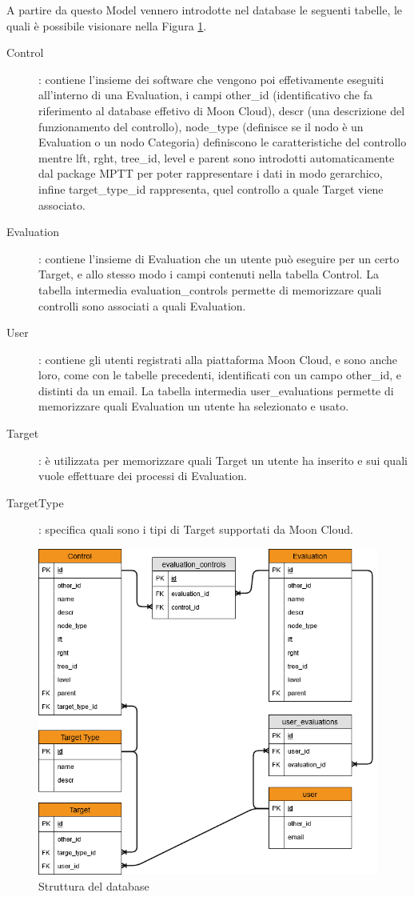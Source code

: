 A partire da questo Model vennero introdotte nel database le seguenti tabelle, le quali è possibile visionare nella Figura 
\ref{fig:str_db_project}.
\begin{description}
	\item[Control]: contiene l'insieme dei software che vengono poi effetivamente eseguiti all'interno di una Evaluation, 
	i campi other\_id (identificativo che fa riferimento al database effetivo di Moon Cloud),
	descr (una descrizione del funzionamento del controllo), node\_type (definisce se il nodo è un Evaluation o un nodo Categoria)
	definiscono le caratteristiche del controllo mentre lft, rght, tree\_id, level e parent sono introdotti 
	automaticamente dal package MPTT per poter rappresentare i dati in modo gerarchico, infine target\_type\_id rappresenta, quel
	controllo a quale Target viene associato. 
	\item[Evaluation]: contiene l'insieme di Evaluation che un utente può eseguire per un certo Target, e allo stesso modo 
	i campi contenuti nella tabella Control. La tabella intermedia evaluation\_controls permette di memorizzare quali controlli
	sono associati a quali Evaluation.
	\item[User]: contiene gli utenti registrati alla piattaforma Moon Cloud, e sono anche loro, come con le tabelle precedenti,
	identificati con un campo other\_id, e distinti da un email. La tabella intermedia user\_evaluations permette di memorizzare 
	quali Evaluation un utente ha selezionato e usato.
	\item[Target]: è utilizzata per memorizzare quali Target un utente ha inserito e sui quali vuole effettuare dei processi
	di Evaluation.  
	\item[TargetType]: specifica quali sono i tipi di Target supportati da Moon Cloud.
\end{description}

\begin{figure}
	\centering
	\includegraphics[scale=0.7]{images/MoonCloudRecommendation_ER.png}
	\caption{Struttura del database}
	\label{fig:str_db_project}
\end{figure}

